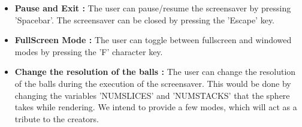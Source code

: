 \documentclass[]{article}
\begin{document}
\begin{flushleft}
\begin{itemize}
\item{ \bf Pause and Exit :}
The user can pause/resume the screensaver by pressing 'Spacebar'. The screensaver can be closed by pressing the 'Escape' key.

\item \textbf{FullScreen Mode :}
The user can toggle between fullscreen and windowed modes by pressing the 'F' character key.

\item { \bf Change the resolution of the balls :}
The user can change the resolution of the balls during the execution of the screensaver. This would be done by changing the variables 'NUMSLICES' and 'NUMSTACKS' that the sphere takes while rendering. We intend to provide a few modes, which will act as a tribute to the creators.

\end{itemize}

\end{flushleft}
\end{document}
